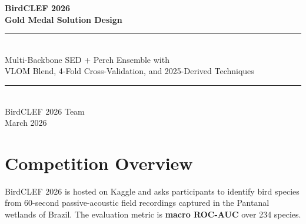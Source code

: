 \documentclass[11pt,a4paper]{article}
\begin{document}
\begin{titlepage}
\centering
\vspace*{2cm}
{\Huge\bfseries\color{deepblue} BirdCLEF 2026\\[0.4em]}
{\LARGE\bfseries\color{gold} Gold Medal Solution Design}\\[1.5em]
\rule{\linewidth}{0.5pt}\\[1em]
{\large Multi-Backbone SED + Perch Ensemble with\\
VLOM Blend, 4-Fold Cross-Validation, and 2025-Derived Techniques}\\[1em]
\rule{\linewidth}{0.5pt}\\[2em]
{\large BirdCLEF 2026 Team}\\[0.5em]
{\normalsize March 2026}\\[3em]

\begin{abstract}
\noindent
We present a complete solution design for BirdCLEF 2026, a multi-label bird sound
recognition competition targeting 234 species in Pantanal soundscapes.
Our approach integrates three complementary streams: (1) Google Perch TFLite models
trained with domain-specific label heads, (2) a multi-backbone Sound Event Detection
(SED) ensemble using EfficientNet-B0, B3-NoisyStudent, and EfficientNetV2-S backbones
trained with Asymmetric Loss and 4-fold cross-validation, and (3) a suite of
inference-time and post-processing techniques derived from 2025 top solutions.
The key innovations are VLOM blending (geometric mean + RMS) for heterogeneous
model fusion, background noise augmentation with domain-matched Pantanal recordings,
overlapping stride inference with TTA circular shift, and 20\%/60\%/20\% temporal
smoothing. Our current public LB score is \textbf{0.892}, and the designed system
targets \textbf{0.926+} (competition rank \#1 as of writing).
\end{abstract}
\end{titlepage}

\tableofcontents
\newpage

\section{Competition Overview}
\label{sec:overview}

BirdCLEF 2026 is hosted on Kaggle and asks participants to identify bird species
from 60-second passive-acoustic field recordings captured in the Pantanal wetlands
of Brazil. The evaluation metric is \textbf{macro ROC-AUC} over 234 species.
\end{document}
